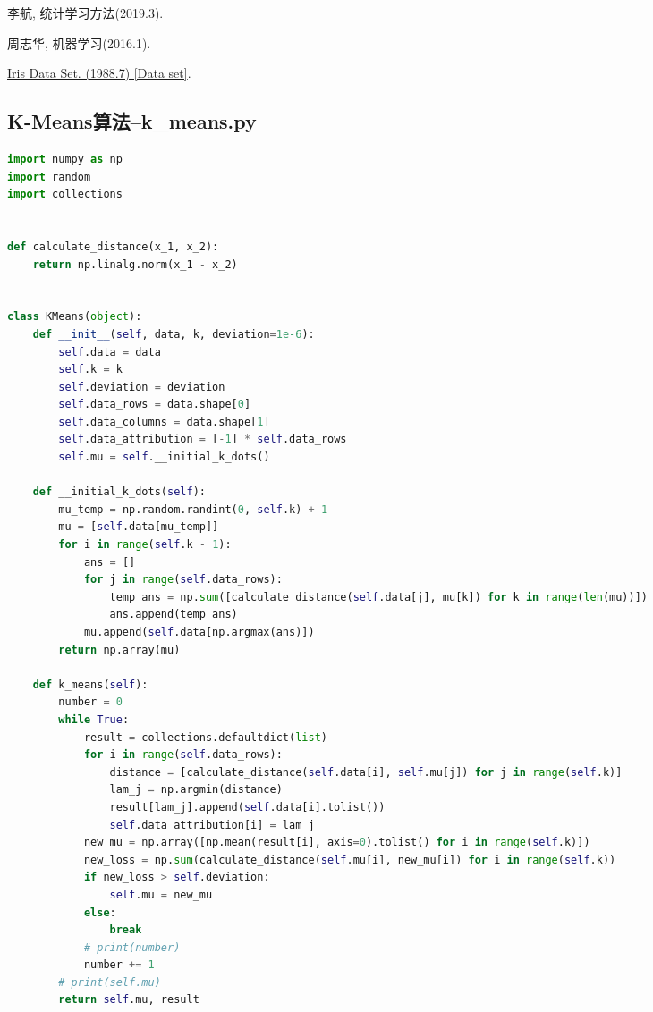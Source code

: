 \documentclass{hitreport}
\begin{document}
\renewcommand\refname{参考文献}
 
\begin{thebibliography}{2}
李航, 统计学习方法(2019.3).

周志华, 机器学习(2016.1).

\href{http://archive.ics.uci.edu/ml/datasets/Iris}{Iris Data Set. (1988.7) [Data set]}.
\end{thebibliography}

\newpage
\begin{appendices}

\section{K-Means算法--k\_means.py}\label{app:kmeans}
\begin{lstlisting}[language=python]
import numpy as np
import random
import collections


def calculate_distance(x_1, x_2):
    return np.linalg.norm(x_1 - x_2)


class KMeans(object):
    def __init__(self, data, k, deviation=1e-6):
        self.data = data
        self.k = k
        self.deviation = deviation
        self.data_rows = data.shape[0]
        self.data_columns = data.shape[1]
        self.data_attribution = [-1] * self.data_rows
        self.mu = self.__initial_k_dots()

    def __initial_k_dots(self):
        mu_temp = np.random.randint(0, self.k) + 1
        mu = [self.data[mu_temp]]
        for i in range(self.k - 1):
            ans = []
            for j in range(self.data_rows):
                temp_ans = np.sum([calculate_distance(self.data[j], mu[k]) for k in range(len(mu))])
                ans.append(temp_ans)
            mu.append(self.data[np.argmax(ans)])
        return np.array(mu)

    def k_means(self):
        number = 0
        while True:
            result = collections.defaultdict(list)
            for i in range(self.data_rows):
                distance = [calculate_distance(self.data[i], self.mu[j]) for j in range(self.k)]
                lam_j = np.argmin(distance)
                result[lam_j].append(self.data[i].tolist())
                self.data_attribution[i] = lam_j
            new_mu = np.array([np.mean(result[i], axis=0).tolist() for i in range(self.k)])
            new_loss = np.sum(calculate_distance(self.mu[i], new_mu[i]) for i in range(self.k))
            if new_loss > self.deviation:
                self.mu = new_mu
            else:
                break
            # print(number)
            number += 1
        # print(self.mu)
        return self.mu, result


\end{lstlisting}
\end{appendices}
\end{document}
